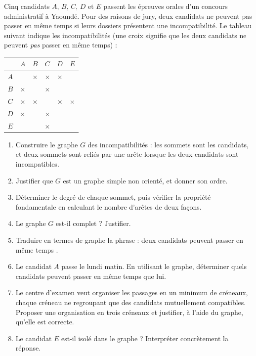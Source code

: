 \documentclass[11pt]{article}
\begin{document}
\begin{exercice}
Cinq candidats $A$, $B$, $C$, $D$ et $E$ passent les épreuves orales d'un concours administratif à Yaoundé. Pour des raisons de jury, deux candidats ne peuvent pas passer en même temps si leurs dossiers présentent une incompatibilité. Le tableau suivant indique les incompatibilités (une croix signifie que les deux candidats ne peuvent \emph{pas} passer en même temps) :
\begin{center}
\begin{tabular}{|c|c|c|c|c|c|}\hline
\rowcolor{popblueL} & $A$ & $B$ & $C$ & $D$ & $E$ \\ \hline
$A$ & & $\times$ & $\times$ & $\times$ & \\ \hline
$B$ & $\times$ & & $\times$ & & \\ \hline
$C$ & $\times$ & $\times$ & & $\times$ & $\times$ \\ \hline
$D$ & $\times$ & & $\times$ & & \\ \hline
$E$ & & & $\times$ & & \\ \hline
\end{tabular}
\end{center}
\begin{enumerate}
\item Construire le graphe $G$ des incompatibilités : les sommets sont les candidats, et deux sommets sont reliés par une arête lorsque les deux candidats sont incompatibles.
\item Justifier que $G$ est un graphe simple non orienté, et donner son ordre.
\item Déterminer le degré de chaque sommet, puis vérifier la propriété fondamentale en calculant le nombre d'arêtes de deux façons.
\item Le graphe $G$ est-il complet ? Justifier.
\item Traduire en termes de graphe la phrase : \og deux candidats peuvent passer en même temps \fg.
\item Le candidat $A$ passe le lundi matin. En utilisant le graphe, déterminer quels candidats peuvent passer en même temps que lui.
\item Le centre d'examen veut organiser les passages en un minimum de créneaux, chaque créneau ne regroupant que des candidats mutuellement compatibles. Proposer une organisation en trois créneaux et justifier, à l'aide du graphe, qu'elle est correcte.
\item Le candidat $E$ est-il isolé dans le graphe ? Interpréter concrètement la réponse.
\end{enumerate}
\end{exercice}
\end{document}
